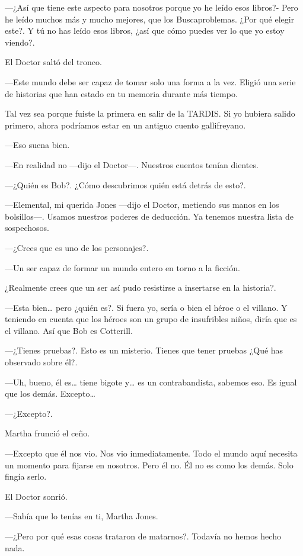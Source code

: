 ---¿Así que tiene este aspecto para nosotros porque yo he leído esos libros?- Pero he leído muchos más y mucho mejores, que los Buscaproblemas. ¿Por qué elegir este?. Y tú no has leído esos libros, ¿así que cómo puedes ver lo que yo estoy viendo?.

El Doctor saltó del tronco.

---Este mundo debe ser capaz de tomar solo una forma a la vez. Eligió una serie de historias que han estado en tu memoria durante más tiempo.

Tal vez sea porque fuiste la primera en salir de la TARDIS. Si yo hubiera salido primero, ahora podríamos estar en un antiguo cuento gallifreyano.

---Eso suena bien.

---En realidad no ---dijo el Doctor---. Nuestros cuentos tenían dientes.

---¿Quién es Bob?. ¿Cómo descubrimos quién está detrás de esto?.

---Elemental, mi querida Jones ---dijo el Doctor, metiendo sus manos en los bolsillos---. Usamos nuestros poderes de deducción. Ya tenemos nuestra lista de sospechosos.

---¿Crees que es uno de los personajes?.

---Un ser capaz de formar un mundo entero en torno a la ficción.

¿Realmente crees que un ser así pudo resistirse a insertarse en la historia?.

---Esta bien\ldots{} pero ¿quién es?. Si fuera yo, sería o bien el héroe o el villano. Y teniendo en cuenta que los héroes son un grupo de insufribles niños, diría que es el villano. Así que Bob es Cotterill.

---¿Tienes pruebas?. Esto es un misterio. Tienes que tener pruebas ¿Qué has observado sobre él?.

---Uh, bueno, él es\ldots{} tiene bigote y\ldots{} es un contrabandista, sabemos eso. Es igual que los demás. Excepto\ldots{}

---¿Excepto?.

Martha frunció el ceño.

---Excepto que él nos vio. Nos vio inmediatamente. Todo el mundo aquí necesita un momento para fijarse en nosotros. Pero él no. Él no es como los demás. Solo fingía serlo.

El Doctor sonrió.

---Sabía que lo tenías en ti, Martha Jones.

---¿Pero por qué esas cosas trataron de matarnos?. Todavía no hemos hecho nada.

